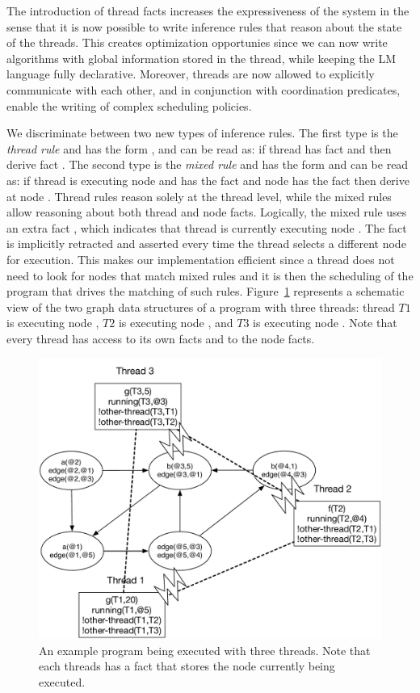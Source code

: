 The introduction of thread facts increases the expressiveness of the system in
the sense that it is now possible to write inference rules that reason about the
state of the threads. This creates optimization opportunies since we can now
write algorithms with global information stored in the thread, while keeping the
LM language fully declarative. Moreover, threads are now allowed to explicitly
communicate with each other, and in conjunction with coordination predicates,
enable the writing of complex scheduling policies.

We discriminate between two new types of inference rules. The first type is the
\emph{thread rule} and has the form , and can be read
as: if thread  has fact  and  then derive fact
. The second type is the \emph{mixed rule} and has the form
 and can be read as: if thread  is executing
node  and has the fact  and node  has the fact
 then derive  at node . Thread rules reason
solely at the thread level, while the mixed rules allow reasoning about both
thread and node facts. Logically, the mixed rule uses an extra fact
, which indicates that thread  is currently
executing node . The  fact is implicitly retracted and
asserted every time the thread selects a different node for execution. This
makes our implementation efficient since a thread does not need to look for
nodes that match mixed rules and it is then the scheduling of the program that
drives the matching of such rules. Figure~\ref{fig:coord:thread_facts}
represents a schematic view of the two graph data structures of a program with
three threads: thread $T1$ is executing node , $T2$ is executing node
, and $T3$ is executing node . Note that every thread has
access to its own facts and to the node facts.

\begin{figure}[ht]
   \includegraphics[width=0.6\linewidth]{figures/threads/threads.pdf}

   \caption{An example program being executed with three threads. Note that each
      threads has a  fact that stores the node currently being
   executed.}

   \label{fig:coord:thread_facts}
\end{figure}

